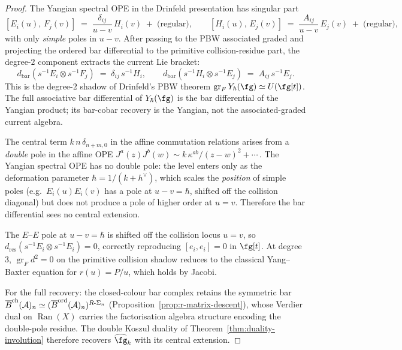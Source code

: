 \begin{construction}
\begin{proof}
The Yangian spectral OPE in the Drinfeld presentation has singular part
\[
 [E_i(u),\,F_j(v)]
 \;=\;
 \frac{\delta_{ij}}{u-v}\,H_i(v)
 \;+\;\text{(regular)},
 \qquad
 [H_i(u),\,E_j(v)]
 \;=\;
 \frac{A_{ij}}{u-v}\,E_j(v)
 \;+\;\text{(regular)},
\]
with only \emph{simple} poles in \(u-v\).  After passing to the PBW
associated graded and projecting the ordered bar differential to the
primitive collision-residue part, the degree-\(2\) component extracts
the current Lie bracket:
\[
 d_{\mathrm{bar}}(s^{-1}E_i\otimes s^{-1}F_j)
 \;=\;
 \delta_{ij}\,s^{-1}H_i,
 \qquad
 d_{\mathrm{bar}}(s^{-1}H_i\otimes s^{-1}E_j)
 \;=\;
 A_{ij}\,s^{-1}E_j.
\]
This is the degree-\(2\) shadow of Drinfeld's PBW theorem
\(\operatorname{gr}_F Y_\hbar(\fg)\simeq U(\fg[t])\).  The full
associative bar differential of \(Y_\hbar(\fg)\) is the bar
differential of the Yangian product; its bar-cobar recovery is the
Yangian, not the associated-graded current algebra.

The central term $k\,n\,\delta_{n+m,0}$ in the affine
commutation relations arises from a \emph{double} pole in the
affine OPE $J^a(z)J^b(w)\sim k\,\kappa^{ab}/(z{-}w)^2+\cdots$\,.
The Yangian spectral OPE has no double pole: the level enters
only as the deformation parameter $\hbar=1/(k{+}h^\vee)$,
which scales the \emph{position} of simple poles (e.g.\
$E_i(u)E_i(v)$ has a pole at $u-v=\hbar$, shifted off the
collision diagonal) but does not produce a pole of higher
order at $u=v$. Therefore the bar differential sees no
central extension.

The $E$--$E$ pole at $u-v=\hbar$ is shifted off the collision
locus $u=v$, so
$d_{\mathrm{res}}(s^{-1}E_i\otimes s^{-1}E_i)=0$, correctly
reproducing $[e_i,e_i]=0$ in $\fg[t]$. At degree~$3$,
\(\operatorname{gr}_F d^2=0\) on the primitive collision shadow
reduces to the classical Yang--Baxter equation for
$r(u)=P/u$, which holds by Jacobi.

For the full recovery: the closed-colour bar complex retains the symmetric bar
$\overline{B}^{\mathrm{ch}}(\mathcal{A})_n\simeq
(\overline{B}^{\mathrm{ord}}(\mathcal{A})_n)^{R\text{-}\Sigma_n}$
(Proposition~\ref{prop:r-matrix-descent}), whose Verdier
dual on $\operatorname{Ran}(X)$ carries the factorisation
algebra structure encoding the double-pole residue. The
double Koszul duality of
Theorem~\ref{thm:duality-involution} therefore recovers
$\widehat{\fg}_k$ with its central extension.
\end{proof}


\end{construction}
